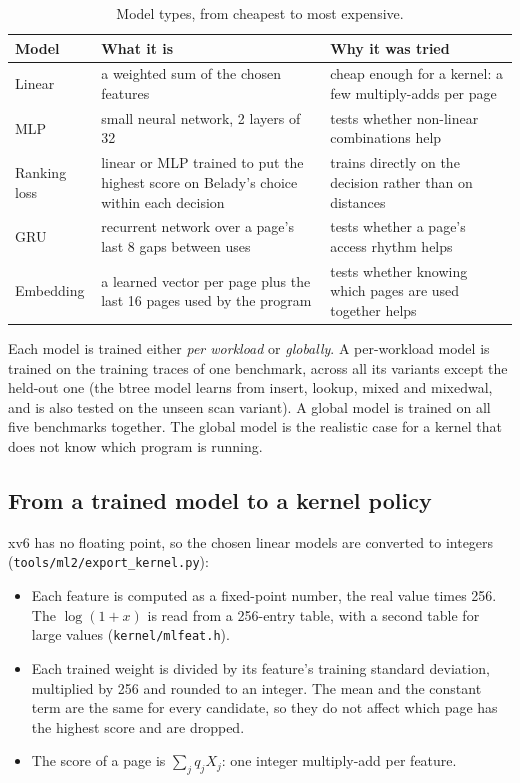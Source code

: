 \documentclass[10.5pt,a4paper]{article}
\newcommand{\code}[1]{\texttt{#1}}
\begin{document}
\begin{table}[!htbp]
\centering\small
\begin{tabularx}{\linewidth}{@{}l>{\raggedright\arraybackslash}X>{\raggedright\arraybackslash}X@{}}
\toprule
\textbf{Model} & \textbf{What it is} & \textbf{Why it was tried} \\
\midrule
Linear & a weighted sum of the chosen features & cheap enough for a kernel: a few multiply-adds per page \\
MLP & small neural network, 2 layers of 32 & tests whether non-linear combinations help \\
Ranking loss & linear or MLP trained to put the highest score on Belady's choice within each decision & trains directly on the decision rather than on distances \\
GRU & recurrent network over a page's last 8 gaps between uses & tests whether a page's access rhythm helps \\
Embedding & a learned vector per page plus the last 16 pages used by the program & tests whether knowing which pages are used together helps \\
\bottomrule
\end{tabularx}
\caption{Model types, from cheapest to most expensive.}
\label{tab:models}
\end{table}

Each model is trained either \emph{per workload} or \emph{globally}. A
per-workload model is trained on the training traces of one benchmark, across
all its variants except the held-out one (the btree model learns from insert,
lookup, mixed and mixedwal, and is also tested on the unseen scan variant). A
global model is trained on all five benchmarks together. The global model is the
realistic case for a kernel that does not know which program is running.

\subsection{From a trained model to a kernel policy}

xv6 has no floating point, so the chosen linear models are converted to
integers (\code{tools/ml2/export\_kernel.py}):

\begin{itemize}
\item Each feature is computed as a fixed-point number, the real value times
256. The $\log(1+x)$ is read from a 256-entry table, with a second table for
large values (\code{kernel/mlfeat.h}).
\item Each trained weight is divided by its feature's training standard
deviation, multiplied by 256 and rounded to an integer. The mean and the
constant term are the same for every candidate, so they do not affect which
page has the highest score and are dropped.
\item The score of a page is $\sum_j q_j X_j$: one integer multiply-add per
feature.
\end{itemize}
\end{document}
